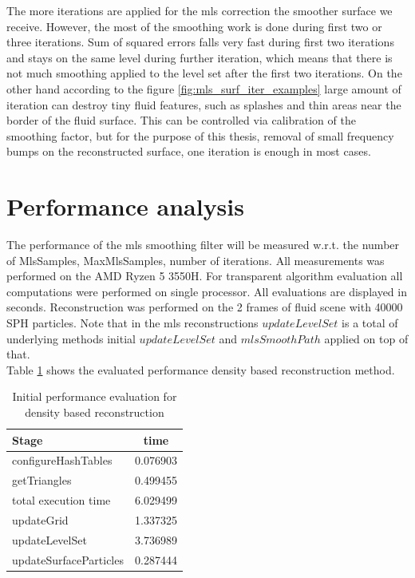 The more iterations are applied for the mls correction the smoother surface we receive. However, the most of the smoothing work is done during first two or three iterations. Sum of squared errors falls very fast during first two iterations and stays on the same level during further iteration, which means that there is not much smoothing applied to the level set after the first two iterations. On the other hand according to the figure \ref{fig:mls_surf_iter_examples} large amount of iteration can destroy tiny fluid features, such as splashes and thin areas near the border of the fluid surface. This can be controlled via calibration of the smoothing factor, but for the purpose of this thesis, removal of small frequency bumps on the reconstructed surface, one iteration is enough in most cases.

\section{Performance analysis}
The performance of the mls smoothing filter will be measured w.r.t. the number of MlsSamples, MaxMlsSamples, number of iterations. All measurements was performed on the AMD Ryzen 5 3550H. For transparent algorithm evaluation all computations were performed on single processor. All evaluations are displayed in seconds. Reconstruction was performed on the 2 frames of fluid scene with 40000 SPH particles. Note that in the mls reconstructions $updateLevelSet$ is a total of underlying methods initial $updateLevelSet$ and $mlsSmoothPath$ applied on top of that.\\
Table \ref{tab:mls_initial_method} shows the evaluated performance density based reconstruction method.
\begin{table}[H]
	\begin{center}
		\scriptsize
		\begin{tabular}{|l|c|}
			\hline
			Stage & time \\
			\hline
				configureHashTables	&	0.076903\\
				getTriangles	&	0.499455\\
				total execution time	&	6.029499\\
				updateGrid	&	1.337325\\
				updateLevelSet	&	3.736989\\
				updateSurfaceParticles	&	0.287444\\
			\hline
		\end{tabular}
	\end{center}
	\caption{Initial performance evaluation for density based reconstruction}
	\label{tab:mls_initial_method}
\end{table}
